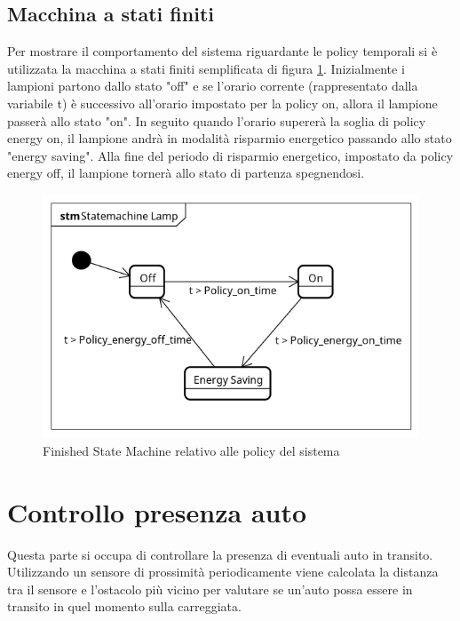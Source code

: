 \subsection{Macchina a stati finiti}
Per mostrare il comportamento del sistema riguardante le policy temporali si è utilizzata la macchina a stati finiti semplificata di figura \ref{FSM POLICY}.
Inizialmente i lampioni partono dallo stato "off" e se l'orario corrente (rappresentato dalla variabile t) è successivo all'orario impostato per la policy on, allora il lampione passerà allo stato "on". In seguito quando l'orario supererà la soglia di policy energy on, il lampione andrà in modalità risparmio energetico passando allo stato "energy saving".
Alla fine del periodo di risparmio energetico, impostato da policy energy off, il lampione tornerà allo stato di partenza spegnendosi.

\begin{figure}[ht]
	\centering
	\includegraphics[scale=.8]{figure/Statemachine_Lamp.png}
	\caption{Finished State Machine relativo alle policy del sistema \label{FSM POLICY}}
\end{figure}
\newpage

\section{Controllo presenza auto}
Questa parte si occupa di controllare la presenza di eventuali auto in transito. Utilizzando un sensore di prossimità periodicamente viene calcolata la distanza tra il sensore e l'ostacolo più vicino per valutare se un'auto possa essere in transito in quel momento sulla carreggiata.

